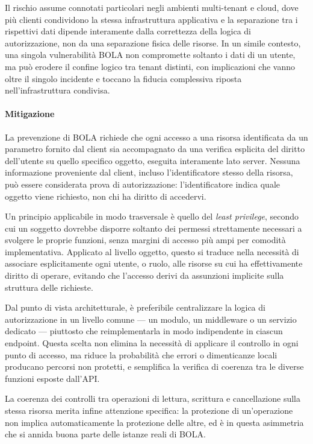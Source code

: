 Il rischio assume connotati particolari negli ambienti multi-tenant e cloud, dove più clienti
condividono la stessa infrastruttura applicativa e la separazione tra i rispettivi dati dipende
interamente dalla correttezza della logica di autorizzazione, non da una separazione fisica delle
risorse. In un simile contesto, una singola vulnerabilità BOLA non compromette soltanto i dati di
un utente, ma può erodere il confine logico tra tenant distinti, con implicazioni che vanno oltre
il singolo incidente e toccano la fiducia complessiva riposta nell'infrastruttura condivisa.

\paragraph{Mitigazione}

La prevenzione di BOLA richiede che ogni accesso a una risorsa identificata da un parametro
fornito dal client sia accompagnato da una verifica esplicita del diritto dell'utente su quello
specifico oggetto, eseguita interamente lato server. Nessuna informazione proveniente dal client,
incluso l'identificatore stesso della risorsa, può essere considerata prova di autorizzazione:
l'identificatore indica quale oggetto viene richiesto, non chi ha diritto di accedervi.

Un principio applicabile in modo trasversale è quello del \textit{least privilege}, secondo cui un soggetto
dovrebbe disporre soltanto dei permessi strettamente necessari a svolgere le proprie funzioni,
senza margini di accesso più ampi per comodità implementativa. Applicato al livello oggetto,
questo si traduce nella necessità di associare esplicitamente ogni utente, o ruolo, alle risorse su
cui ha effettivamente diritto di operare, evitando che l'accesso derivi da assunzioni implicite
sulla struttura delle richieste.

Dal punto di vista architetturale, è preferibile centralizzare la logica di autorizzazione in un
livello comune --- un modulo, un middleware o un servizio dedicato --- piuttosto che
reimplementarla in modo indipendente in ciascun endpoint. Questa scelta non elimina la necessità di
applicare il controllo in ogni punto di accesso, ma riduce la probabilità che errori o
dimenticanze locali producano percorsi non protetti, e semplifica la verifica di coerenza tra le
diverse funzioni esposte dall'API.

La coerenza dei controlli tra operazioni di lettura, scrittura e cancellazione sulla stessa risorsa
merita infine attenzione specifica: la protezione di un'operazione non implica automaticamente la
protezione delle altre, ed è in questa asimmetria che si annida buona parte delle istanze reali di
BOLA.

